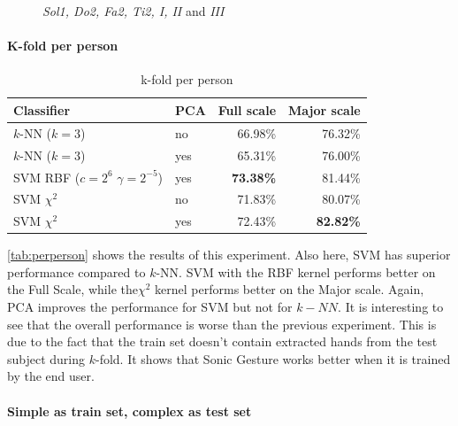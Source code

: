 \begin{figure}[tb]
\hspace{0.03\linewidth}
\caption{\emph{Sol1, Do2, Fa2, Ti2, I, II} and \emph{III}}
\label{fig:goodhands}
\end{figure}


\paragraph{K-fold per person}

\begin{table}
\centering
\begin{tabular}{llrr}
\hline\hline
 Classifier & PCA	& Full scale	& Major scale \\
\hline
$k$-NN ($k=3$) &	no	& 66.98\% & 76.32\%	\\
$k$-NN ($k=3$) &	yes	& 65.31\% & 76.00\%	\\
SVM RBF ($c=2^6$ $\gamma=2^{-5}$) & yes & \textbf{73.38\%} & 81.44\%	\\
SVM $\chi^2$ &	no	&  71.83\% & 80.07\% \\
SVM $\chi^2$ &	yes	&  72.43\% & \textbf{82.82\%} \\
\hline
\end{tabular}
\caption{k-fold per person}
\label{tab:perperson}
\end{table}


\autoref{tab:perperson} shows the results of this experiment. Also here, SVM has superior performance compared to $k$-NN. SVM with the RBF kernel performs better on the Full Scale, while the$\chi^2$ kernel performs better on the Major scale. Again, PCA improves the performance for SVM but not for $k-NN$. It is interesting to see that the overall performance is worse than the previous experiment. This is due to the fact that the train set doesn't contain extracted hands from the test subject during $k$-fold. It shows that Sonic Gesture works better when it is trained by the end user.

\paragraph{Simple as train set, complex as test set}


